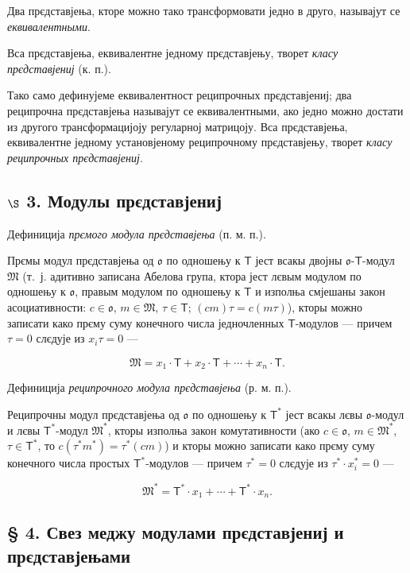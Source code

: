 \documentclass[11pt]{article}
\begin{document}
Два прєдставјења, кторе можно тако трансформовати једно в друго, называјут се \emph{еквивалентными}.

Вса прєдставјења, еквивалентне једному прєдставјењу, творет \emph{класу прєдставјениј} (к. п.).

Тако само дефинујеме еквивалентност реципрочных прєдставјениј; два реципрочна прєдставјења называјут се еквивалентными, ако једно можно достати из другого трансформацијоју регуларној матрицоју. Вса прєдставјења, еквивалентне једному установјеному реципрочному прєдставјењу, творет \emph{класу реципрочных прєдставјениј}.

\subsection*{\texorpdfstring{\(\S\) 3. Модулы прєдставјениј}{\textbackslash С 3. Модулы прєдставјениј}}\label{s-3.-darstellungsmoduln}

Дефиниција \emph{прємого модула прєдставјења} (п. м. п.).

Прємы модул прєдставјења од \(\mathfrak{o}\) по одношењу к \(\mathsf T\) јест всакы двојны \(\mathfrak{o}\)-\(\mathsf T\)-модул \(\mathfrak M\) (т.~ј. адитивно записана Абелова група, ктора јест лєвым модулом по одношењу к \(\mathfrak{o}\), правым модулом по одношењу к \(\mathsf T\) и изполња смјешаны закон асоциативности: \(c\in\mathfrak{o}\), \(m\in\mathfrak M\), \(\tau\in\mathsf T\); \((cm)\tau=c(m\tau)\)), кторы можно записати како прєму суму конечного числа једночленных \(\mathsf T\)-модулов --- причем \(\tau=0\) слєдује из \(x_i\tau=0\) ---

\[
\mathfrak M=x_1\cdot\mathsf T+x_2\cdot\mathsf T+\cdots+x_n\cdot\mathsf T.
\]

Дефиниција \emph{реципрочного модула прєдставјења} (р. м. п.).

Реципрочны модул прєдставјења од \(\mathfrak{o}\) по одношењу к \(\mathsf T^*\) јест всакы лєвы \(\mathfrak{o}\)-модул и лєвы \(\mathsf T^*\)-модул \(\mathfrak M^*\), кторы изполња закон комутативности (ако \(c\in\mathfrak{o}\), \(m\in\mathfrak M^*\), \(\tau\in\mathsf T^*\), то \(c(\tau^*m^*)=\tau^*(cm)\)) и кторы можно записати како прєму суму конечного числа простых \(\mathsf T^*\)-модулов --- причем \(\tau^*=0\) слєдује из \(\tau^*\cdot x_i^*=0\) ---

\[
\mathfrak M^*=\mathsf T^*\cdot x_1+\cdots+\mathsf T^*\cdot x_n.
\]

\subsection*{§ 4. Свез меджу модулами прєдставјениј и прєдставјењами}\label{der-zusammenhang-zwischen-darstellungsmoduln-und-darstellungen}
\end{document}
